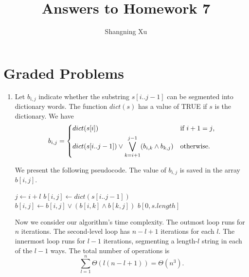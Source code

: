 \documentclass{article}
\title{Answers to Homework 7}
\author{Shangning Xu}
\begin{document}
\maketitle

\section{Graded Problems}

\begin{enumerate}
    \item Let $b_{i, j}$ indicate whether the substring $s[i..j - 1]$ can be segmented into dictionary words. The function $dict(s)$ has a value of TRUE if $s$ is the dictionary. We have
    \[
        b_{i, j} = \begin{dcases*}
            dict(s[i]) & if $i + 1 = j$,\\
            dict(s[i..j - 1]) \lor \bigvee_{k = i + 1}^{j - 1} (b_{i, k} \land b_{k, j}) & otherwise.
        \end{dcases*}
    \]

    We present the following pseudocode. The value of $b_{i, j}$ is saved in the array $b[i, j]$.
    \begin{algorithmic}[1]
                \State $j \gets i + l$
                \State $b[i, j] \gets dict(s[i..j - 1])$
                    \State $b[i, j] \gets b[i, j] \lor (b[i, k] \land b[k, j])$
                \EndFor
            \EndFor
        \EndFor
        \State \Return $b[0, s.length]$
    \end{algorithmic}

    Now we consider our algorithm's time complexity. The outmost loop runs for $n$ iterations. The second-level loop has $n - l + 1$ iterations for each $l$. The innermost loop runs for $l - 1$ iterations, segmenting a length-$l$ string in each of the $l - 1$ ways. The total number of operations is
    \[
        \sum_{l = 1}^{n} \Theta(l(n - l + 1)) = \Theta(n^3).
    \]


\end{enumerate}
\end{document}
